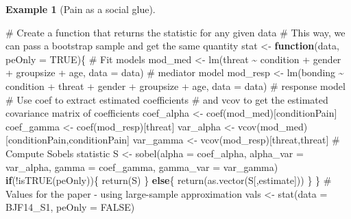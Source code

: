 \documentclass[
  11pt,
  letterpaper,
]{scrbook}
\newenvironment{Shaded}{\begin{snugshade}}{\end{snugshade}}
\newcommand{\AttributeTok}[1]{\textcolor[rgb]{0.40,0.45,0.13}{#1}}
\newcommand{\CommentTok}[1]{\textcolor[rgb]{0.37,0.37,0.37}{#1}}
\newcommand{\ConstantTok}[1]{\textcolor[rgb]{0.56,0.35,0.01}{#1}}
\newcommand{\ControlFlowTok}[1]{\textcolor[rgb]{0.00,0.23,0.31}{\textbf{#1}}}
\newcommand{\FunctionTok}[1]{\textcolor[rgb]{0.28,0.35,0.67}{#1}}
\newcommand{\NormalTok}[1]{\textcolor[rgb]{0.00,0.23,0.31}{#1}}
\newcommand{\OtherTok}[1]{\textcolor[rgb]{0.00,0.23,0.31}{#1}}
\newcommand{\SpecialCharTok}[1]{\textcolor[rgb]{0.37,0.37,0.37}{#1}}
\newcommand{\StringTok}[1]{\textcolor[rgb]{0.13,0.47,0.30}{#1}}
\theoremstyle{definition}
\theoremstyle{definition}
\newtheorem{example}{Example}[chapter]
\theoremstyle{remark}
\begin{document}
\begin{example}[Pain as a social
glue]
\begin{Shaded}
\begin{Highlighting}[]
\CommentTok{\# Create a function that returns the statistic for any given data}
\CommentTok{\# This way, we can pass a bootstrap sample and get the same quantity}
\NormalTok{stat }\OtherTok{\textless{}{-}} \ControlFlowTok{function}\NormalTok{(data, }\AttributeTok{peOnly =} \ConstantTok{TRUE}\NormalTok{)\{}
  \CommentTok{\# Fit models}
\NormalTok{mod\_med }\OtherTok{\textless{}{-}} \FunctionTok{lm}\NormalTok{(threat }\SpecialCharTok{\textasciitilde{}}\NormalTok{ condition }\SpecialCharTok{+}\NormalTok{ gender }\SpecialCharTok{+}\NormalTok{ groupsize }\SpecialCharTok{+}\NormalTok{ age,}
          \AttributeTok{data =}\NormalTok{ data) }\CommentTok{\# mediator model}
\NormalTok{mod\_resp }\OtherTok{\textless{}{-}} \FunctionTok{lm}\NormalTok{(bonding }\SpecialCharTok{\textasciitilde{}}\NormalTok{ condition }\SpecialCharTok{+}\NormalTok{ threat }\SpecialCharTok{+}\NormalTok{ gender }\SpecialCharTok{+}\NormalTok{ groupsize }\SpecialCharTok{+}\NormalTok{ age,}
           \AttributeTok{data =}\NormalTok{ data) }\CommentTok{\# response model}
\CommentTok{\# Use \textquotesingle{}coef\textquotesingle{} to extract estimated coefficients}
\CommentTok{\# and \textquotesingle{}vcov\textquotesingle{} to get the estimated covariance matrix of coefficients}
\NormalTok{coef\_alpha }\OtherTok{\textless{}{-}} \FunctionTok{coef}\NormalTok{(mod\_med)[}\StringTok{\textquotesingle{}conditionPain\textquotesingle{}}\NormalTok{]}
\NormalTok{coef\_gamma }\OtherTok{\textless{}{-}} \FunctionTok{coef}\NormalTok{(mod\_resp)[}\StringTok{\textquotesingle{}threat\textquotesingle{}}\NormalTok{]}
\NormalTok{var\_alpha }\OtherTok{\textless{}{-}} \FunctionTok{vcov}\NormalTok{(mod\_med)[}\StringTok{\textquotesingle{}conditionPain\textquotesingle{}}\NormalTok{,}\StringTok{\textquotesingle{}conditionPain\textquotesingle{}}\NormalTok{]}
\NormalTok{var\_gamma }\OtherTok{\textless{}{-}} \FunctionTok{vcov}\NormalTok{(mod\_resp)[}\StringTok{\textquotesingle{}threat\textquotesingle{}}\NormalTok{,}\StringTok{\textquotesingle{}threat\textquotesingle{}}\NormalTok{]}
  \CommentTok{\# Compute Sobel\textquotesingle{}s statistic}
\NormalTok{  S }\OtherTok{\textless{}{-}} \FunctionTok{sobel}\NormalTok{(}\AttributeTok{alpha =}\NormalTok{ coef\_alpha,}
             \AttributeTok{alpha\_var =}\NormalTok{ var\_alpha,}
             \AttributeTok{gamma =}\NormalTok{ coef\_gamma,}
             \AttributeTok{gamma\_var =}\NormalTok{ var\_gamma)}
  \ControlFlowTok{if}\NormalTok{(}\SpecialCharTok{!}\FunctionTok{isTRUE}\NormalTok{(peOnly))\{}
    \FunctionTok{return}\NormalTok{(S)}
\NormalTok{  \} }\ControlFlowTok{else}\NormalTok{\{}
    \FunctionTok{return}\NormalTok{(}\FunctionTok{as.vector}\NormalTok{(S[,}\StringTok{\textquotesingle{}estimate\textquotesingle{}}\NormalTok{]))}
\NormalTok{  \}}
\NormalTok{\}}
\CommentTok{\# Values for the paper {-} using large{-}sample approximation}
\NormalTok{vals }\OtherTok{\textless{}{-}} \FunctionTok{stat}\NormalTok{(}\AttributeTok{data =}\NormalTok{ BJF14\_S1, }\AttributeTok{peOnly =} \ConstantTok{FALSE}\NormalTok{)}
\end{Highlighting}
\end{Shaded}


\end{example}
\end{document}

